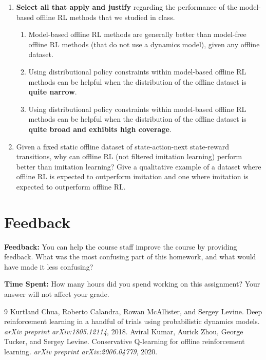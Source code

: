 \documentclass[11pt]{article}
\begin{document}
\begin{enumerate}[label=(\roman*)]
  \item \textbf{Select all that apply and justify} regarding the performance of the model-based offline RL methods that we studied in class.
  \begin{enumerate}[label=\arabic*.]
    \item Model-based offline RL methods are generally better than model-free offline RL methods (that do not use a dynamics model), given any offline dataset.
    \item Using distributional policy constraints within model-based offline RL methods can be helpful when the distribution of the offline dataset is \textbf{quite narrow}.
    \item Using distributional policy constraints within model-based offline RL methods can be helpful when the distribution of the offline dataset is \textbf{quite broad and exhibits high coverage}.
  \end{enumerate}

  \item Given a fixed static offline dataset of state-action-next state-reward transitions, why can offline RL (not filtered imitation learning) perform better than imitation learning? Give a qualitative example of a dataset where offline RL is expected to outperform imitation and one where imitation is expected to outperform offline RL.
\end{enumerate}

\section*{Feedback}
\textbf{Feedback:} You can help the course staff improve the course by providing feedback. What was the most confusing part of this homework, and what would have made it less confusing?

\textbf{Time Spent:} How many hours did you spend working on this assignment? Your answer will not affect your grade.

\begin{thebibliography}{9}
 Kurtland Chua, Roberto Calandra, Rowan McAllister, and Sergey Levine. Deep reinforcement learning in a handful of trials using probabilistic dynamics models. \emph{arXiv preprint arXiv:1805.12114}, 2018.
 Aviral Kumar, Aurick Zhou, George Tucker, and Sergey Levine. Conservative Q-learning for offline reinforcement learning. \emph{arXiv preprint arXiv:2006.04779}, 2020.
\end{thebibliography}
\end{document}
